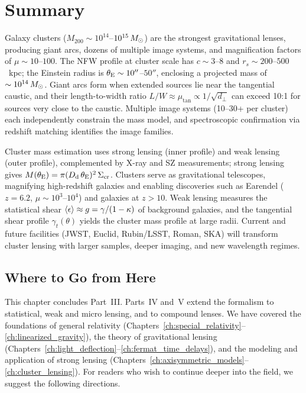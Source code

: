 \section{Summary}
\label{sec:cluster_summary}

Galaxy clusters ($M_{200} \sim 10^{14}$--$10^{15}\,
M_{\odot}$) are the strongest gravitational lenses, producing giant arcs,
dozens of multiple image systems, and magnification factors of
$\mu \sim 10$--$100$.  The NFW profile at cluster scale has
$c \sim 3$--$8$ and $r_s \sim 200$--$500$~kpc; the Einstein radius
is $\theta_{\mathrm{E}} \sim 10''$--$50''$, enclosing a projected mass of
$\sim 10^{14}\,M_{\odot}$.  Giant arcs form when extended sources lie
near the tangential caustic, and their length-to-width ratio
$L/W \approx \mu_{\mathrm{tan}} \propto 1/\sqrt{d_\perp}$ can exceed
10:1 for sources very close to the caustic.  Multiple image systems
(10--30+ per cluster) each independently constrain the mass model,
and spectroscopic confirmation via redshift matching identifies the
image families.

Cluster mass estimation uses strong lensing (inner profile) and weak
lensing (outer profile), complemented by X-ray and SZ measurements;
strong lensing gives $M(\theta_{\mathrm{E}}) = \pi(D_{\mathrm{d}}\,\theta_{\mathrm{E}})^2\,\Sigma_{\mathrm{cr}}$.
Clusters serve as gravitational telescopes, magnifying high-redshift
galaxies and enabling discoveries such as Earendel ($z = 6.2$,
$\mu \sim 10^3$--$10^4$) and galaxies at $z > 10$.  Weak lensing
measures the statistical shear
$\langle\epsilon\rangle \approx g = \gamma/(1-\kappa)$ of
background galaxies, and the tangential shear profile
$\gamma_t(\theta)$ yields the cluster mass profile at large radii.
Current and future facilities (JWST, Euclid, Rubin/LSST, Roman, SKA)
will transform cluster lensing with larger samples, deeper imaging,
and new wavelength regimes.

\subsection*{Where to Go from Here}

This chapter concludes Part~III.  Parts~IV and~V extend the formalism to
statistical, weak and micro lensing, and to compound lenses.
We have covered the foundations of general relativity
(Chapters~\ref{ch:special_relativity}--\ref{ch:linearized_gravity}), the theory of gravitational lensing
(Chapters~\ref{ch:light_deflection}--\ref{ch:fermat_time_delays}), and the modeling and application of strong lensing
(Chapters~\ref{ch:axisymmetric_models}--\ref{ch:cluster_lensing}).  For readers who wish to continue deeper into the
field, we suggest the following directions.

